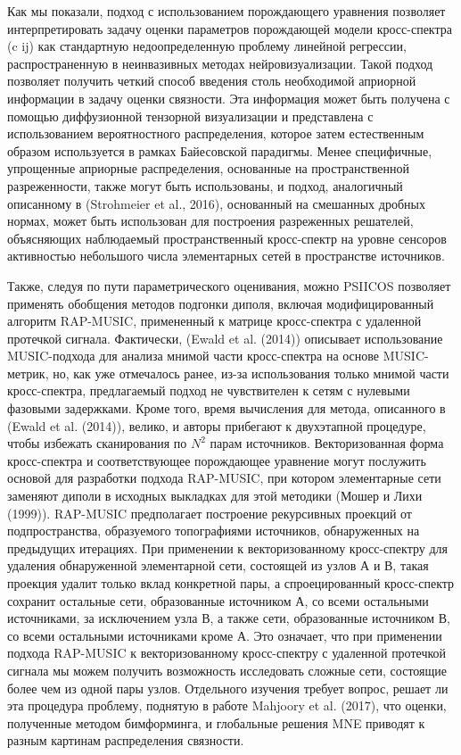 Как мы показали, подход с использованием порождающего уравнения позволяет
интерпретировать задачу оценки параметров порождающей модели кросс-спектра (c
ij) как стандартную недоопределенную проблему линейной регрессии,
распространенную в неинвазивных методах нейровизуализации.  Такой подход
позволяет получить четкий способ введения столь необходимой априорной
информации в задачу оценки связности. Эта информация может быть получена с
помощью диффузионной тензорной визуализации и представлена с использованием
вероятностного распределения, которое затем естественным образом используется в
рамках Байесовской парадигмы.
Менее специфичные, упрощенные априорные распределения, основанные на
пространственной разреженности, также могут быть использованы, и подход,
аналогичный описанному в (Strohmeier et al., 2016), основанный на смешанных
дробных нормах, может быть использован для построения
разреженных решателей, объясняющих наблюдаемый пространственный кросс-спектр на
уровне сенсоров активностью небольшого числа элементарных сетей в пространстве
источников.

Также, следуя по пути параметрического оценивания, можно PSIICOS позволяет применять
обобщения методов подгонки диполя, включая модифицированный алгоритм RAP-MUSIC, примененный к
матрице кросс-спектра с удаленной протечкой сигнала. Фактически, (Ewald et al. (2014)) описывает
использование MUSIC-подхода для анализа мнимой части кросс-спектра на
основе MUSIC-метрик, но, как уже отмечалось ранее, из-за использования только
мнимой части кросс-спектра, предлагаемый подход не чувствителен к сетям с
нулевыми фазовыми задержками. Кроме того, время вычисления для метода, описанного в
(Ewald et al. (2014)), велико, и авторы прибегают к двухэтапной процедуре,
чтобы избежать сканирования по $N^2$ парам источников.
Векторизованная форма кросс-спектра и соответствующее порождающее уравнение могут послужить основой
для разработки подхода RAP-MUSIC, при котором элементарные сети заменяют диполи
в исходных выкладках для этой методики (Мошер и Лихи (1999)). RAP-MUSIC
предполагает построение рекурсивных проекций от подпространства, образуемого
топографиями источников, обнаруженных на предыдущих итерациях. При применении к
векторизованному кросс-спектру для удаления обнаруженной элементарной сети,
состоящей из узлов А и В, такая проекция удалит только вклад конкретной
пары, а спроецированный кросс-спектр сохранит остальные сети, образованные источником А,
со всеми остальными источниками, за исключением узла В, а также сети, образованные источником В,
со всеми остальными источниками кроме А. Это означает, что при применении
подхода RAP-MUSIC к векторизованному кросс-спектру с удаленной протечкой сигнала мы можем
получить возможность исследовать сложные сети, состоящие более чем из одной
пары узлов. Отдельного изучения требует вопрос, решает ли эта процедура проблему, поднятую в работе
Mahjoory et al. (2017), что оценки, полученные методом бимформинга, и глобальные решения MNE
приводят к разным картинам распределения связности.


